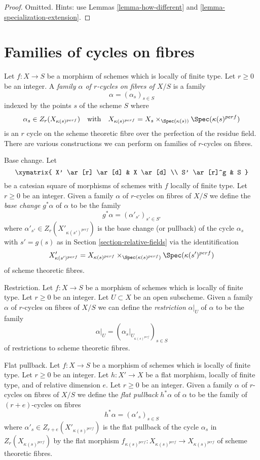 \begin{proof}
Omitted. Hints: use Lemmas \ref{lemma-how-different} and
\ref{lemma-specialization-extension}.
\end{proof}









\section{Families of cycles on fibres}
\label{section-cycles-fibres}

\noindent
Let $f : X \to S$ be a morphism of schemes which is locally of finite type.
Let $r \geq 0$ be an integer. A
{\it family $\alpha$ of $r$-cycles on fibres of $X/S$} is a family
$$
\alpha = (\alpha_s)_{s \in S}
$$
indexed by the points $s$ of the scheme $S$ where
$$
\alpha_s \in Z_r(X_{\kappa(s)^{perf}})
\quad\text{with}\quad
X_{\kappa(s)^{perf}} = X_s \times_{\Spec(\kappa(s))} \Spec(\kappa(s)^{perf})
$$
is an $r$ cycle on the scheme theoretic fibre over the perfection of
the residue field. There are various constructions we can perform on
families of $r$-cycles on fibres.

\medskip\noindent
Base change. Let
$$
\xymatrix{
X' \ar[r] \ar[d] & X \ar[d] \\
S' \ar[r]^g & S
}
$$
be a catesian square of morphisms of schemes with $f$ locally of finite type.
Let $r \geq 0$ be an integer. Given a family $\alpha$ of $r$-cycles on
fibres of $X/S$ we define the {\it base change} $g^*\alpha$ of $\alpha$
to be the family
$$
g^*\alpha = (\alpha'_{s'})_{s' \in S'}
$$
where $\alpha'_{s'} \in Z_r(X'_{\kappa(s')^{perf}})$ is the base change
(or pullback) of the cycle $\alpha_s$ with $s' = g(s)$ as in
Section \ref{section-relative-fields} via the identitification
$$
X'_{\kappa(s')^{perf}} =
X_{\kappa(s)^{perf}} \times_{\Spec(\kappa(s)^{perf})} \Spec(\kappa(s')^{perf})
$$
of scheme theoretic fibres.

\medskip\noindent
Restriction. Let $f : X \to S$ be a morphism of schemes which is locally
of finite type. Let $r \geq 0$ be an integer. Let $U \subset X$ be an open
subscheme. Given a family $\alpha$ of $r$-cycles on fibres of $X/S$
we can define the {\it restriction} $\alpha|_U$ of $\alpha$ to be the family
$$
\alpha|_U = (\alpha_s|_{U_{\kappa(s)^{perf}}})_{s \in S}
$$
of restrictions to scheme theoretic fibres.

\medskip\noindent
Flat pullback. Let $f : X \to S$ be a morphism of schemes which is locally
of finite type. Let $r \geq 0$ be an integer. Let $h : X' \to X$ be a
flat morphism, locally of finite type, and of relative dimension $e$.
Let $r \geq 0$ be an integer. Given a family $\alpha$ of $r$-cycles
on fibres of $X/S$ we define the {\it flat pullback} $h^*\alpha$ of $\alpha$
to be the family of $(r + e)$-cycles on fibres
$$
h^*\alpha = (\alpha'_s)_{s \in S}
$$
where $\alpha'_s \in Z_{r + e}(X'_{\kappa(s)^{perf}})$ is the flat pullback
of the cycle $\alpha_s$ in $Z_r(X_{\kappa(s)^{perf}})$ by the flat morphism
$f_{\kappa(s)^{perf}} : X_{\kappa(s)^{perf}} \to X_{\kappa(s)^{perf}}$
of scheme theoretic fibres.

